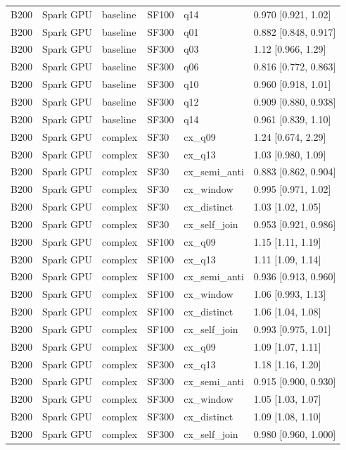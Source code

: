 \begin{longtable}{llllll}
B200 & Spark GPU & baseline & SF100 & q14 & 0.970 [0.921, 1.02] \\
B200 & Spark GPU & baseline & SF300 & q01 & 0.882 [0.848, 0.917] \\
B200 & Spark GPU & baseline & SF300 & q03 & 1.12 [0.966, 1.29] \\
B200 & Spark GPU & baseline & SF300 & q06 & 0.816 [0.772, 0.863] \\
B200 & Spark GPU & baseline & SF300 & q10 & 0.960 [0.918, 1.01] \\
B200 & Spark GPU & baseline & SF300 & q12 & 0.909 [0.880, 0.938] \\
B200 & Spark GPU & baseline & SF300 & q14 & 0.961 [0.839, 1.10] \\
B200 & Spark GPU & complex & SF30 & cx\_q09 & 1.24 [0.674, 2.29] \\
B200 & Spark GPU & complex & SF30 & cx\_q13 & 1.03 [0.980, 1.09] \\
B200 & Spark GPU & complex & SF30 & cx\_semi\_anti & 0.883 [0.862, 0.904] \\
B200 & Spark GPU & complex & SF30 & cx\_window & 0.995 [0.971, 1.02] \\
B200 & Spark GPU & complex & SF30 & cx\_distinct & 1.03 [1.02, 1.05] \\
B200 & Spark GPU & complex & SF30 & cx\_self\_join & 0.953 [0.921, 0.986] \\
B200 & Spark GPU & complex & SF100 & cx\_q09 & 1.15 [1.11, 1.19] \\
B200 & Spark GPU & complex & SF100 & cx\_q13 & 1.11 [1.09, 1.14] \\
B200 & Spark GPU & complex & SF100 & cx\_semi\_anti & 0.936 [0.913, 0.960] \\
B200 & Spark GPU & complex & SF100 & cx\_window & 1.06 [0.993, 1.13] \\
B200 & Spark GPU & complex & SF100 & cx\_distinct & 1.06 [1.04, 1.08] \\
B200 & Spark GPU & complex & SF100 & cx\_self\_join & 0.993 [0.975, 1.01] \\
B200 & Spark GPU & complex & SF300 & cx\_q09 & 1.09 [1.07, 1.11] \\
B200 & Spark GPU & complex & SF300 & cx\_q13 & 1.18 [1.16, 1.20] \\
B200 & Spark GPU & complex & SF300 & cx\_semi\_anti & 0.915 [0.900, 0.930] \\
B200 & Spark GPU & complex & SF300 & cx\_window & 1.05 [1.03, 1.07] \\
B200 & Spark GPU & complex & SF300 & cx\_distinct & 1.09 [1.08, 1.10] \\
B200 & Spark GPU & complex & SF300 & cx\_self\_join & 0.980 [0.960, 1.000] \\
\end{longtable}

